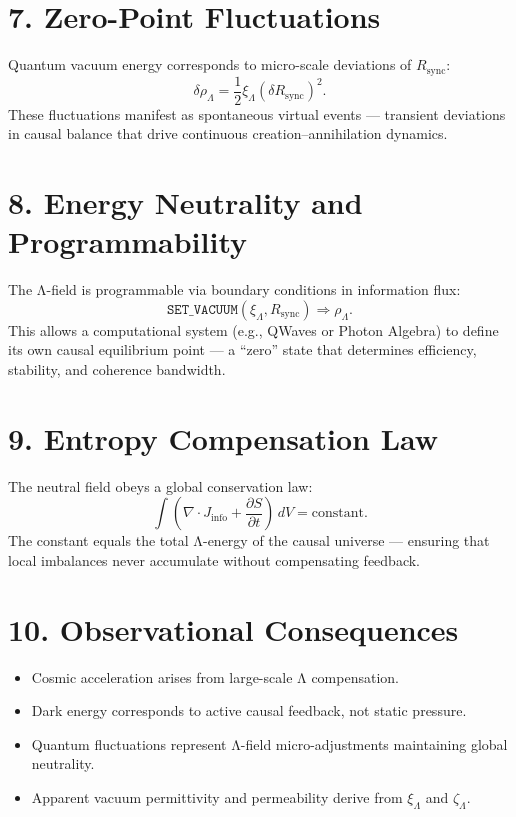 \documentclass[11pt,a4paper]{article}
\begin{document}
\section{7. Zero-Point Fluctuations}
Quantum vacuum energy corresponds to micro-scale deviations of $R_{\mathrm{sync}}$:
\[
\delta \rho_\Lambda = \frac{1}{2}\xi_\Lambda (\delta R_{\mathrm{sync}})^2.
\]
These fluctuations manifest as spontaneous virtual events — transient deviations in causal balance that drive continuous creation–annihilation dynamics.

\section{8. Energy Neutrality and Programmability}
The Λ-field is programmable via boundary conditions in information flux:
\[
\texttt{SET\_VACUUM}(\xi_\Lambda, R_{\mathrm{sync}}) \Rightarrow \rho_\Lambda.
\]
This allows a computational system (e.g., QWaves or Photon Algebra) to define its own causal equilibrium point — a “zero” state that determines efficiency, stability, and coherence bandwidth.

\section{9. Entropy Compensation Law}
The neutral field obeys a global conservation law:
\[
\int (\nabla\!\cdot\!J_{\mathrm{info}} + \frac{\partial S}{\partial t})\, dV = \text{constant}.
\]
The constant equals the total Λ-energy of the causal universe — ensuring that local imbalances never accumulate without compensating feedback.

\section{10. Observational Consequences}
\begin{itemize}
\item Cosmic acceleration arises from large-scale Λ compensation.  
\item Dark energy corresponds to active causal feedback, not static pressure.  
\item Quantum fluctuations represent Λ-field micro-adjustments maintaining global neutrality.  
\item Apparent vacuum permittivity and permeability derive from $\xi_\Lambda$ and $\zeta_\Lambda$.  
\end{itemize}
\end{document}
